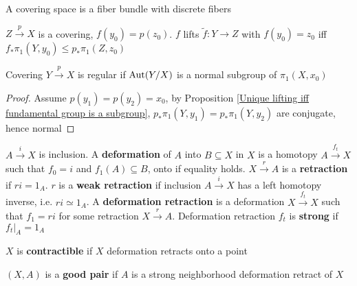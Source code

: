 \documentclass[main]{subfiles}
\begin{document}
\begin{definition}
A covering space is a fiber bundle with discrete fibers
\end{definition}

\begin{proposition}\label{Unique lifting iff fundamental group is a subgroup}
$Z\xrightarrow pX$ is a covering, $f(y_0)=p(z_0)$. $f$ lifts $\tilde f: Y\to Z$ with $f(y_0)=z_0$ iff $f_*\pi_1(Y,y_0)\leq p_*\pi_1(Z,z_0)$
\begin{center}
\end{center}
\end{proposition}

\begin{proposition}
Covering $Y\xrightarrow p X$ is regular if $\operatorname{Aut}(Y/X)$ is a normal subgroup of $\pi_1(X,x_0)$
\end{proposition}

\begin{proof}
Assume $p(y_1)=p(y_2)=x_0$, by Proposition \ref{Unique lifting iff fundamental group is a subgroup}, $p_*\pi_1(Y,y_1)=p_*\pi_1(Y,y_2)$ are conjugate, hence normal
\end{proof}

\begin{definition}
$A\xrightarrow iX$ is inclusion. A \textbf{deformation} of $A$ into $B\subseteq X$ in $X$ is a homotopy $A\xrightarrow{f_t} X$ such that $f_0=i$ and $f_1(A)\subseteq B$, onto if equality holds. $X\xrightarrow rA$ is a \textbf{retraction} if $ri=1_A$. $r$ is a \textbf{weak retraction} if inclusion $A\xrightarrow iX$ has a left homotopy inverse, i.e. $ri\simeq1_A$. A \textbf{deformation retraction} is a deformation $X\xrightarrow{f_t} X$ such that $f_1=ri$ for some retraction $X\xrightarrow rA$. Deformation retraction $f_t$ is \textbf{strong} if $f_t|_A=1_A$ \par
$X$ is \textbf{contractible} if $X$ deformation retracts onto a point \par
$(X,A)$ is a \textbf{good pair} if $A$ is a strong neighborhood deformation retract of $X$
\end{definition}
\end{document}
